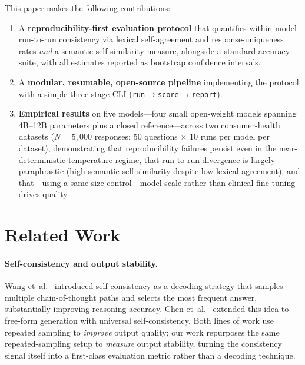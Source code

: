 \documentclass[11pt]{article}
\begin{document}
This paper makes the following contributions:
\begin{enumerate}
  \item A \textbf{reproducibility-first evaluation protocol} that
        quantifies within-model run-to-run consistency via lexical
        self-agreement and response-uniqueness rates \emph{and} a
        semantic self-similarity measure, alongside a standard accuracy
        suite, with all estimates reported as bootstrap confidence
        intervals.
  \item A \textbf{modular, resumable, open-source pipeline} implementing
        the protocol with a simple three-stage CLI
        (\texttt{run\;$\to$\;score\;$\to$\;report}).
  \item \textbf{Empirical results} on five models---four small
        open-weight models spanning 4B--12B parameters plus a closed
        reference---across two consumer-health datasets ($N{=}5{,}000$
        responses; 50 questions $\times$ 10 runs per model per dataset),
        demonstrating that reproducibility failures persist even in the
        near-deterministic temperature regime, that run-to-run
        divergence is largely paraphrastic (high semantic
        self-similarity despite low lexical agreement), and that---using
        a same-size control---model scale rather than clinical
        fine-tuning drives quality.
\end{enumerate}

\section{Related Work}
\label{sec:related}

\paragraph{Self-consistency and output stability.}
Wang et~al.~\cite{wang2022selfconsistency} introduced self-consistency
as a decoding strategy that samples multiple chain-of-thought paths
and selects the most frequent answer, substantially improving reasoning
accuracy. Chen et~al.~\cite{chen2023universal} extended this idea to
free-form generation with universal self-consistency.
Both lines of work use repeated sampling to \emph{improve} output quality;
our work repurposes the same repeated-sampling setup to \emph{measure}
output stability, turning the consistency signal itself into a
first-class evaluation metric rather than a decoding technique.
\end{document}
